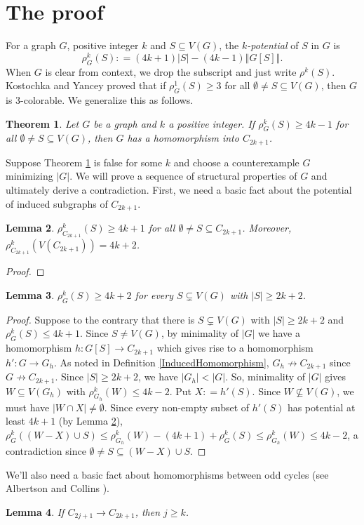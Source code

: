 \documentclass[12pt]{amsart}
\theoremstyle{plain}
\newtheorem{thm}{Theorem}
\newtheorem{lem}[thm]{Lemma}
\theoremstyle{definition}
\theoremstyle{remark}
\newcommand{\card}[1]{\left|#1\right|}
\newcommand{\size}[1]{\left\Vert#1\right\Vert}
\newcommand{\func}[3]{#1\colon #2 \rightarrow #3}
\newcommand{\DefinedAs}{\mathrel{\mathop:}=}
\begin{document}
\section{The proof}
For a graph $G$, positive integer $k$ and $S \subseteq V(G)$, the \emph{$k$-potential} of $S$ in $G$ is \[\rho^k_G(S) \DefinedAs (4k+1)|S| - (4k-1)\size{G[S]}.\]  When $G$ is clear from context, we drop the subscript and just write $\rho^k(S)$. Kostochka and Yancey \cite{kostochkayancey2012ore} proved that if $\rho^1_G(S) \ge 3$ for all $\emptyset \ne S \subseteq V(G)$, then $G$ is $3$-colorable.  We generalize this as follows.

\begin{thm}\label{MainTheorem}
Let $G$ be a graph and $k$ a positive integer.  If $\rho^k_G(S) \ge 4k-1$ for all $\emptyset \ne S \subseteq V(G)$, then $G$ has a homomorphism into $C_{2k+1}$.
\end{thm}

Suppose Theorem \ref{MainTheorem} is false for some $k$ and choose a counterexample $G$ minimizing $\card{G}$.  
We will prove a sequence of structural properties of $G$ and ultimately derive a contradiction.  First, we need a basic fact about the potential of induced subgraphs of $C_{2k+1}$.

\begin{lem}\label{PotentialOfInducedPieces}
$\rho^k_{C_{2k+1}}(S) \ge 4k+1$ for all $\emptyset \ne S \subseteq C_{2k+1}$.  Moreover, $\rho^k_{C_{2k+1}}(V(C_{2k+1})) = 4k+2$.
\end{lem}
\begin{proof}
\end{proof}

\begin{lem}
$\rho^k_G(S) \ge 4k+2$ for every $S \subsetneq V(G)$ with $\card{S} \ge 2k + 2$.
\end{lem}
\begin{proof}
Suppose to the contrary that there is $S \subsetneq V(G)$ with $\card{S} \ge 2k + 2$ and $\rho^k_G(S) \le 4k+1$.  Since $S \ne V(G)$, by minimality of $\card{G}$ we have a homomorphism $\func{h}{G[S]}{C_{2k+1}}$ which gives rise to a homomorphism $\func{h'}{G}{G_h}$. As noted in Definition \ref{InducedHomomorphism}, $G_h \not \rightarrow C_{2k+1}$ since $G \not \rightarrow C_{2k+1}$.  Since $\card{S} \ge 2k + 2$, we have $|G_h| < |G|$. So, minimality of $|G|$ gives $W \subseteq V(G_h)$ with $\rho^k_{G_h}(W) \le 4k-2$.  Put $X \DefinedAs h'(S)$. Since $W \not \subseteq V(G)$, we must have $\card{W \cap X} \ne \emptyset$.  Since every non-empty subset of $h'(S)$ has potential at least $4k+1$ (by Lemma \ref{PotentialOfInducedPieces}), $\rho^k_G((W - X) \cup S) \le \rho^k_{G_h}(W) - (4k+1) + \rho^k_G(S) \le \rho^k_{G_h}(W) \le 4k-2$, a contradiction since $\emptyset \ne S \subseteq (W - X) \cup S$.
\end{proof}

We'll also need a basic fact about homomorphisms between odd cycles (see Albertson and Collins \cite{albertson1985homomorphisms}).
\begin{lem}\label{NoHomomorphism}
If $C_{2j+1} \rightarrow C_{2k + 1}$, then $j \ge k$.
\end{lem}



\end{document}
